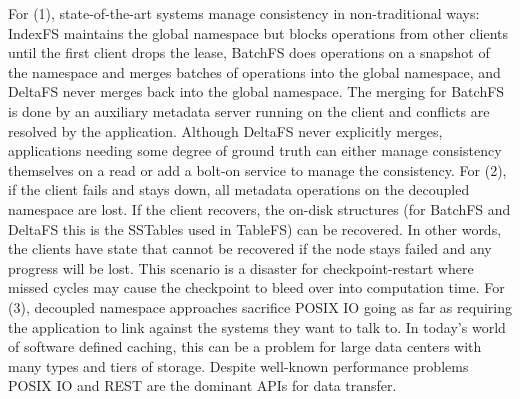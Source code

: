 For (1), state-of-the-art systems manage consistency in non-traditional ways:
IndexFS maintains the global namespace but blocks operations from other clients
until the first client drops the lease, BatchFS does operations on a snapshot
of the namespace and merges batches of operations into the global namespace,
and DeltaFS never merges back into the global namespace. The merging for
BatchFS is done by an auxiliary metadata server running on the client and
conflicts are resolved by the application. Although DeltaFS never explicitly
merges, applications needing some degree of ground truth can either manage
consistency themselves on a read or add a bolt-on service to manage the
consistency. For (2), if the client fails and stays down, all metadata
operations on the decoupled namespace are lost. If the client recovers, the
on-disk structures (for BatchFS and DeltaFS this is the SSTables used in
TableFS) can be recovered. In other words, the clients have state that cannot
be recovered if the node stays failed and any progress will be lost. This
scenario is a disaster for checkpoint-restart where missed cycles may cause the
checkpoint to bleed over into computation time. For (3), decoupled namespace
approaches sacrifice POSIX IO going as far as requiring the application to link
against the systems they want to talk to. In today's world of software defined
caching, this can be a problem for large data centers with many types and tiers
of storage. Despite well-known performance problems POSIX IO and REST are the
dominant APIs for data transfer.
